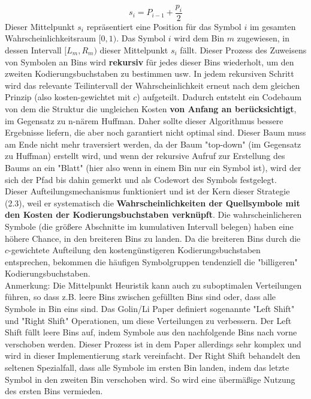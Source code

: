 \documentclass[a4paper,10pt,ngerman]{scrartcl}
\begin{document}
\begin{equation}
  s_i = P_{i - 1} + \frac{p_i}{2}
  \label{eq:5}
\end{equation}
Dieser Mittelpunkt $s_i$ repräsentiert eine Position für das Symbol $i$ im gesamten Wahrscheinlichkeitsraum $[0, 1)$. Das Symbol $i$ wird dem Bin $m$ zugewiesen, in dessen Intervall $[L_m, R_m)$ dieser Mittelpunkt $s_i$ fällt. Dieser Prozess des Zuweisens von Symbolen an Bins wird \textbf{rekursiv} für jedes dieser Bins wiederholt, um den zweiten Kodierungsbuchstaben zu bestimmen usw. In jedem rekursiven Schritt wird das relevante Teilintervall der Wahrscheinlichkeit erneut nach dem gleichen Prinzip (also kosten-gewichtet mit $c$) aufgeteilt. Dadurch entsteht ein Codebaum von dem die Struktur die ungleichen Kosten \textbf{von Anfang an berücksichtigt}, im Gegensatz zu n-närem Huffman. Daher sollte dieser Algorithmus bessere Ergebnisse liefern, die aber noch garantiert nicht optimal sind. Dieser Baum muss am Ende nicht mehr traversiert werden, da der Baum "top-down" (im Gegensatz zu Huffman) erstellt wird, und wenn der rekursive Aufruf zur Erstellung des Baums an ein "Blatt" (hier also wenn in einem Bin nur ein Symbol ist), wird der sich der Pfad bis dahin gemerkt und als Codewort des Symbols festgelegt. \\
\newline
Dieser Aufteilungsmechanismus funktioniert und ist der Kern dieser Strategie (2.3), weil er systematisch die \textbf{Wahrscheinlichkeiten der Quellsymbole mit den Kosten der Kodierungsbuchstaben verknüpft}. Die wahrscheinlicheren Symbole (die größere Abschnitte im kumulativen Intervall belegen) haben eine höhere Chance, in den breiteren Bins zu landen. Da die breiteren Bins durch die $c$-gewichtete Aufteilung den kostengünstigeren Kodierungsbuchstaben entsprechen, bekommen die häufigen Symbolgruppen tendenziell die "billigeren" Kodierungsbuchstaben.\\
\newline
Anmerkung: Die Mittelpunkt Heuristik kann auch zu suboptimalen Verteilungen führen, so dass z.B. leere Bins zwischen gefüllten Bins sind oder, dass alle Symbole in Bin eins sind. Das Golin/Li Paper definiert sogenannte "Left Shift" und "Right Shift" Operationen, um diese Verteilungen zu verbessern. Der Left Shift füllt leere Bins auf, indem Symbole aus den nachfolgende Bins nach vorne verschoben werden. Dieser Prozess ist in dem Paper allerdings sehr komplex und wird in dieser Implementierung stark vereinfacht. Der Right Shift behandelt den seltenen Spezialfall, dass alle Symbole im ersten Bin landen, indem das letzte Symbol in den zweiten Bin verschoben wird. So wird eine übermäßige Nutzung des ersten Bins vermieden. 
\end{document}
